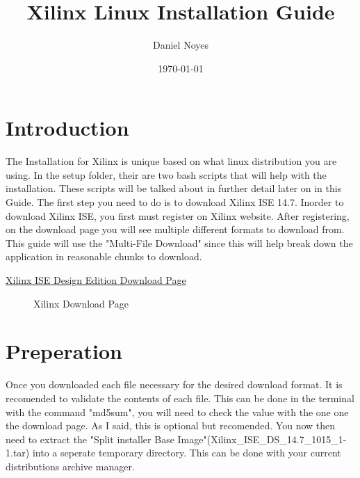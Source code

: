 \documentclass[letter]{article}
\begin{document}
\title{Xilinx Linux Installation Guide}
\author{Daniel Noyes}
\date{\today}
\maketitle
{}

\section{Introduction}
The Installation for Xilinx is unique based on what linux distribution you are using. In the setup folder, their are two bash scripts that will help with the installation. These scripts will be talked about in further detail later on in this Guide. The first step you need to do is to download Xilinx ISE 14.7. Inorder to download Xilinx ISE, you first must register on Xilinx website. After registering, on the download page you will see multiple different formats to download from. This guide will use the "Multi-File Download" since this will help break down the application in reasonable chunks to download.

\begin{center}
	\href{http://www.xilinx.com/support/download/index.html/content/xilinx/en/downloadNav/design-tools.html}{Xilinx ISE Design Edition Download Page}
\end{center}

\begin{figure}[!htbp]
  \centering
  \caption{\texttrademark Xilinx Download Page}
\end{figure}

\section{Preperation}
Once you downloaded each file necessary for the desired download format. It is recomended to validate the contents of each file. This can be done in the terminal with the command "md5sum", you will need to check the value with the one one the download page. As I said, this is optional but recomended. You now then need to extract the "Split installer Base Image"(Xilinx\_ISE\_DS\_14.7\_1015\_1-1.tar) into a seperate temporary directory. This can be done with your current distributions archive manager.
\end{document}
